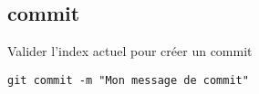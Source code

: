 \subsection*{commit}
Valider l'index actuel pour créer un commit
\begin{verbatim}
git commit -m "Mon message de commit"
\end{verbatim}
